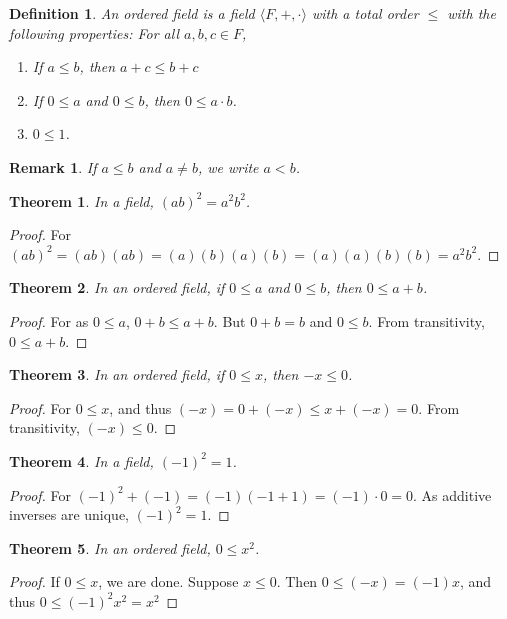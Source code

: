 \documentclass[12pt,oneside]{book}
\theoremstyle{mystyle}
\newtheorem{theorem}{Theorem}[section]
\newtheorem{definition}{Definition}[section]
\newtheorem{remark}{Remark}[section]
\begin{document}
\begin{definition}
An ordered field is a field $\langle F,+,\cdot \rangle$ with a total order $\leq$ with the following properties: For all $a,b,c\in F$,
\begin{enumerate}
\item If $a\leq b$, then $a+c\leq b+c$
\item If $0 \leq a$ and $0\leq b$, then $0\leq a\cdot b$.
\item $0\leq 1$.
\end{enumerate}
\end{definition}

\begin{remark}
If $a\leq b$ and $a\ne b$, we write $a<b$.
\end{remark}

\begin{theorem}
In a field, $(ab)^2 = a^2b^2$.
\end{theorem}
\begin{proof}
For $(ab)^2 = (ab)(ab)=(a)(b)(a)(b)= (a)(a)(b)(b)=a^2b^2$.
\end{proof}

\begin{theorem} In an ordered field, if $0\leq a$ and $0\leq b$, then $0\leq a+b$.
\end{theorem}
\begin{proof}
For as $0\leq a$, $0+b\leq a+b$. But $0+b = b$ and $0\leq b$. From transitivity, $0\leq a+b$.
\end{proof}

\begin{theorem}
In an ordered field, if $0\leq x$, then $-x\leq 0$.
\end{theorem}
\begin{proof}
For $0\leq x$, and thus $(-x)=0+(-x)\leq x+(-x) =0$. From transitivity, $(-x)\leq 0$.
\end{proof}

\begin{theorem}
In a field, $(-1)^2 = 1$.
\end{theorem}
\begin{proof}
For $(-1)^2 +(-1) = (-1)(-1+1) = (-1)\cdot 0 = 0$. As additive inverses are unique, $(-1)^2 = 1$.
\end{proof}

\begin{theorem}
In an ordered field, $0\leq x^2$.
\end{theorem}
\begin{proof}
If $0 \leq x$, we are done. Suppose $x\leq 0$. Then $0\leq (-x) = (-1)x$, and thus $0\leq (-1)^2 x^2=x^2$
\end{proof}
\end{document}
